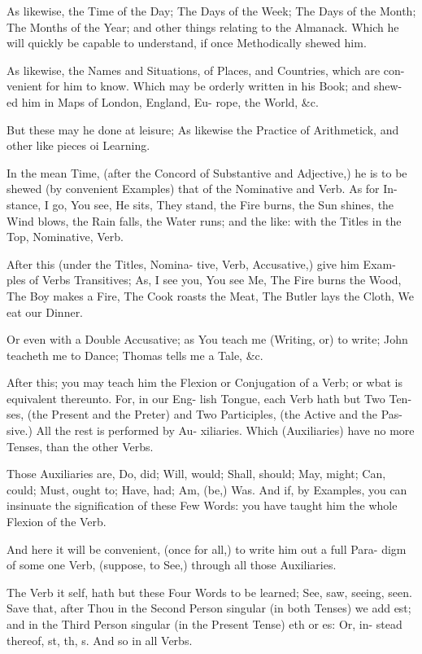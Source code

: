 As likewise, the Time of the Day; The
Days of the Week; The Days of the Month;
The Months of the Year; and other things
relating to the Almanack. Which he will
quickly be capable to understand, if once
Methodically shewed him.

As likewise, the Names and Situations,
of Places, and Countries, which are con-
venient for him to know. Which may
be orderly written in his Book; and shew-
ed him in Maps of London, England, Eu-
rope, the World, &c.

But these may he done at leisure; As
likewise the Practice of Arithmetick, and
other like pieces oi Learning.

In the mean Time, (after the Concord
of Substantive and Adjective,) he is to be
shewed (by convenient Examples) that
of the Nominative and Verb. As for In-
stance, I go, You see, He sits, They stand,
the Fire burns, the Sun shines, the Wind
blows, the Rain falls, the Water runs;
and the like: with the Titles in the Top,
Nominative, Verb.

After this (under the Titles, Nomina-
tive, Verb, Accusative,) give him Exam-
ples of Verbs Transitives; As, I see you,
You see Me, The Fire burns the Wood, The
Boy makes a Fire, The Cook roasts the
Meat, The Butler lays the Cloth, We eat
our Dinner.

Or even with a Double Accusative; as
You teach me (Writing, or) to write;
John teacheth me to Dance; Thomas tells
me a Tale, &c.

After this; you may teach him the
Flexion or Conjugation of a Verb; or wbat
is equivalent thereunto. For, in our Eng-
lish Tongue, each Verb hath but Two Ten-
ses, (the Present and the Preter) and
Two Participles, (the Active and the Pas-
sive.) All the rest is performed by Au-
xiliaries. Which (Auxiliaries) have no
more Tenses, than the other Verbs.

Those Auxiliaries are, Do, did; Will,
would; Shall, should; May, might; Can,
could; Must, ought to; Have, had; Am,
(be,) Was. And if, by Examples, you
can insinuate the signification of these Few
Words: you have taught him the whole
Flexion of the Verb.

And here it will be convenient, (once
for all,) to write him out a full Para-
digm of some one Verb, (suppose, to See,)
through all those Auxiliaries.

The Verb it self, hath but these Four
Words to be learned; See, saw, seeing,
seen. Save that, after Thou in the Second
Person singular (in both Tenses) we add
est; and in the Third Person singular (in
the Present Tense) eth or es: Or, in-
stead thereof, st, th, s. And so in all
Verbs.

